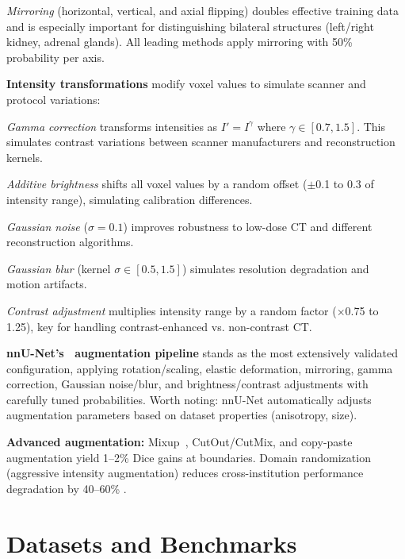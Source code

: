 \documentclass[conference]{IEEEtran}
\begin{document}
\emph{Mirroring} (horizontal, vertical, and axial flipping) doubles effective training data and is especially important for distinguishing bilateral structures (left/right kidney, adrenal glands). All leading methods apply mirroring with 50\% probability per axis.

\textbf{Intensity transformations} modify voxel values to simulate scanner and protocol variations:

\emph{Gamma correction} transforms intensities as $I' = I^\gamma$ where $\gamma \in [0.7, 1.5]$. This simulates contrast variations between scanner manufacturers and reconstruction kernels.

\emph{Additive brightness} shifts all voxel values by a random offset ($\pm$0.1 to 0.3 of intensity range), simulating calibration differences.

\emph{Gaussian noise} ($\sigma = 0.1$) improves robustness to low-dose CT and different reconstruction algorithms.

\emph{Gaussian blur} (kernel $\sigma \in [0.5, 1.5]$) simulates resolution degradation and motion artifacts.

\emph{Contrast adjustment} multiplies intensity range by a random factor ($\times$0.75 to 1.25), key for handling contrast-enhanced vs. non-contrast CT.

\textbf{nnU-Net's~\cite{isensee2021nnunet} augmentation pipeline} stands as the most extensively validated configuration, applying rotation/scaling, elastic deformation, mirroring, gamma correction, Gaussian noise/blur, and brightness/contrast adjustments with carefully tuned probabilities. Worth noting: nnU-Net automatically adjusts augmentation parameters based on dataset properties (anisotropy, size).

\textbf{Advanced augmentation:} Mixup~\cite{zhang2018mixup}, CutOut/CutMix, and copy-paste augmentation yield 1--2\% Dice gains at boundaries. Domain randomization (aggressive intensity augmentation) reduces cross-institution performance degradation by 40--60\% \cite{isensee2021nnunet, wasserthal2023totalsegmentator}.

\FloatBarrier

\section{Datasets and Benchmarks}
\label{sec:datasets}
\end{document}
